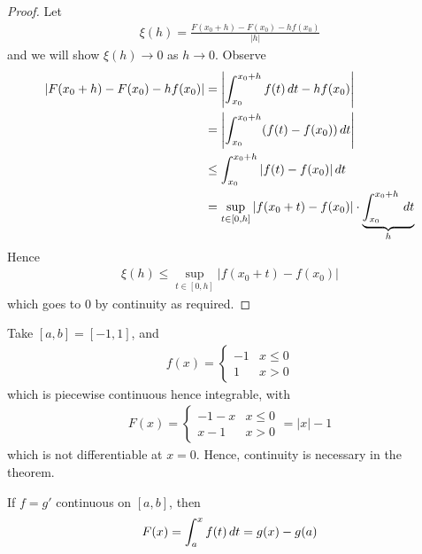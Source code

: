 \documentclass{../template/note}
\begin{document}
    \begin{proof}
        Let
        \begin{align*}
            \xi(h) = \frac{F(x_0+h)-F(x_0)-hf(x_0)}{|h|}
        \end{align*}
        and we will show \(\xi(h) \to 0\) as \(h \to 0\). Observe
        \begin{align*}
            |F(x_0+h)-F(x_0)-hf(x_0)| &= \left|\int_{x_0}^{x_0+h} f(t) \,d{t} - hf(x_0)\right| \\
            &= \left|\int_{x_0}^{x_0+h} (f(t)-f(x_0)) \,d{t}\right| \\
            &\leq \int_{x_0}^{x_0+h} |f(t)-f(x_0)| \,d{t} \\
            &= \sup_{t \in [0, h]}|f(x_0+t)-f(x_0)| \cdot \underbrace{\int_{x_0}^{x_0+h} \,d{t}}_h
        \end{align*}
        Hence
        \begin{align*}
            \xi(h) \leq \sup_{t \in [0, h]}|f(x_0+t)-f(x_0)|
        \end{align*}
        which goes to 0 by continuity as required. 
    \end{proof}
    
    \begin{example*}
        Take \([a, b] = [-1, 1]\), and
        \begin{align*}
            f(x) = \begin{cases}
                -1 & x \leq 0 \\
                1 & x > 0
            \end{cases}
        \end{align*}
        which is piecewise continuous hence integrable, with
        \begin{align*}
            F(x) = \begin{cases}
                -1-x & x \leq 0 \\
                x-1 & x > 0
            \end{cases} = |x| - 1
        \end{align*}
        which is not differentiable at \(x=0\). Hence, continuity is necessary in the theorem.       
    \end{example*}
    
    \begin{corollary}
        If \(f = g'\) continuous on \([a, b]\), then
        \begin{align*}
            F(x) = \int_a^x f(t) \,d{t} = g(x) - g(a)
        \end{align*}
    \end{corollary}
    
\end{document}
